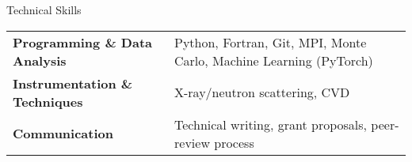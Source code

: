 
\begin{rubric}{Technical Skills}
\begin{tabular}{@{}ll@{}}
\textbf{Programming \& Data Analysis} & Python, Fortran, Git, MPI, Monte Carlo, Machine Learning (PyTorch) \\
\textbf{Instrumentation \& Techniques} & X-ray/neutron scattering, CVD\\
\textbf{Communication} & Technical writing, grant proposals, peer-review process\\
\end{tabular}
\end{rubric}
